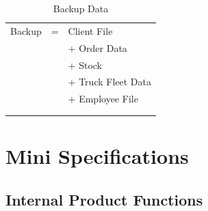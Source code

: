 \documentclass[11pt,a4paper,oneside,svgnames]{report}
\begin{document}
\begin{longtable}{p{3.5cm}p{0.5cm}p{8.5cm}}
Backup & = &  Client File\\
&  & + Order Data\\
&  & + Stock \\
&  & + Truck Fleet Data\\
&  & + Employee File\\
\hfill\\
\caption{Backup Data}\\
\end{longtable}

\chapter{Mini Specifications}
\section{Internal Product Functions}
\end{document}

